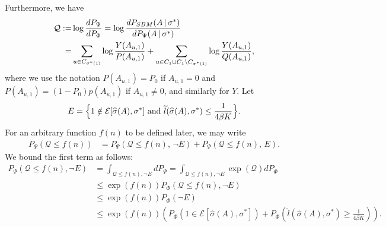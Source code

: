 \documentclass{article}
\begin{document}
Furthermore, we have
\begin{align*}
\mathcal{Q} := & \log \frac{d P_{\Psi}}{d P_{\Phi}} = \log \frac{ d P_{SBM}(A {\,|\,} \sigma^*)}{ d P_{\Psi} (A {\,|\,} \sigma^*)} \\
      =& \sum_{u \in C_{\sigma^*(1)}} \log \frac{Y(A_{u, 1})}{P(A_{u, 1})} + \sum_{u \in C_1 \cup C_1 \backslash C_{\sigma^*(1)}  } \log \frac{Y(A_{u, 1})}{Q(A_{u, 1})},
\end{align*}
where we use the notation $P(A_{u, 1}) = P_0$ if $A_{u, 1} = 0$ and $P(A_{u, 1}) = (1-P_0)p(A_{u, 1})$ if $A_{u, 1} \neq 0$, and similarly for $Y$. Let
$$E = \Big\{1 \notin\mathcal{E}[\widehat{\sigma}(A), \sigma^*] \textrm{ and } \widetilde{l}(\widehat{\sigma}(A), \sigma^*) \leq \frac{1}{4\beta K} \Big\}.$$ 
For an arbitrary function $f(n)$ to be defined later, we may write
\begin{align}
P_{\Psi}( \mathcal{Q} \leq f(n) ) & = P_{\Psi}( \mathcal{Q} \leq f(n),\, \neg E) + P_{\Psi}( \mathcal{Q} \leq f(n),\, E).
\label{eqn:psi_Q_bound}
\end{align}
We bound the first term as follows:
\begin{align*}
P_{\Psi}( \mathcal{Q} \leq f(n), \neg E) &= \int_{\mathcal{Q} \leq f(n), \neg E} d P_{\Psi} = \int_{\mathcal{Q} \leq f(n), \neg E} \exp(\mathcal{Q}) d P_{\Phi} \\
    &\leq \exp(f(n)) P_{\Phi}( \mathcal{Q} \leq f(n), \neg E) \\
    &\leq \exp(f(n)) P_{\Phi}(\neg E) \\
    &\leq \exp(f(n)) \left( P_{\Phi}(1 \in \mathcal{E}[\hat{\sigma}(A), \sigma^*]) + 
               P_{\Phi} \left( \tilde{l}(\hat{\sigma}(A), \sigma^*) \geq \frac{1}{4\beta K}  \right) \right).
\end{align*}
\end{document}
